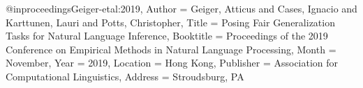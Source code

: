 @inproceedings{Geiger-etal:2019,
  Author = {Geiger, Atticus  and  Cases, Ignacio  and  Karttunen, Lauri  and  Potts, Christopher},
  Title = {Posing Fair Generalization Tasks for Natural Language Inference},
  Booktitle = {Proceedings of the 2019 Conference on Empirical Methods in Natural Language Processing},
  Month = {November},
  Year = {2019},
  Location = {Hong Kong},
  Publisher = {Association for Computational Linguistics},
  Address = {Stroudsburg, PA}}
